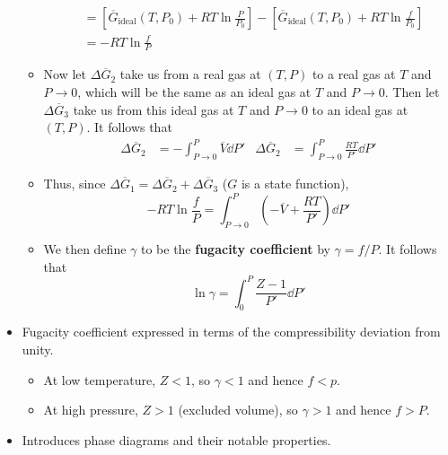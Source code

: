 \documentclass[../notes.tex]{subfiles}
\begin{document}
\begin{itemize}
\begin{itemize}
\begin{align*}
            &= \left[ \overline{G}_\text{ideal}(T,P_0)+RT\ln\frac{P}{P_0} \right]-\left[ \overline{G}_\text{ideal}(T,P_0)+RT\ln\frac{f}{P_0} \right]\\
            &= -RT\ln\frac{f}{P}
        \end{align*}
        \item Now let $\Delta\overline{G}_2$ take us from a real gas at $(T,P)$ to a real gas at $T$ and $P\to 0$, which will be the same as an ideal gas at $T$ and $P\to 0$. Then let $\Delta\overline{G}_3$ take us from this ideal gas at $T$ and $P\to 0$ to an ideal gas at $(T,P)$. It follows that
        \begin{align*}
            \Delta\overline{G}_2 &= -\int_{P\to 0}^P\overline{V}\dd{P'}&
            \Delta\overline{G}_2 &= \int_{P\to 0}^P\frac{RT}{P'}\dd{P'}
        \end{align*}
        \item Thus, since $\Delta\overline{G}_1=\Delta\overline{G}_2+\Delta\overline{G}_3$ ($G$ is a state function),
        \begin{equation*}
            -RT\ln\frac{f}{P} = \int_{P\to 0}^P\left( -\overline{V}+\frac{RT}{P'} \right)\dd{P'}
        \end{equation*}
        \item We then define $\gamma$ to be the \textbf{fugacity coefficient} by $\gamma=f/P$. It follows that
        \begin{equation*}
            \ln\gamma = \int_0^P\frac{Z-1}{P'}\dd{P'}
        \end{equation*}
    \end{itemize}
    \item Fugacity coefficient expressed in terms of the compressibility deviation from unity.
    \begin{itemize}
        \item At low temperature, $Z<1$, so $\gamma<1$ and hence $f<p$.
        \item At high pressure, $Z>1$ (excluded volume), so $\gamma>1$ and hence $f>P$.
    \end{itemize}
    \item Introduces phase diagrams and their notable properties.
\end{itemize}
\end{document}
